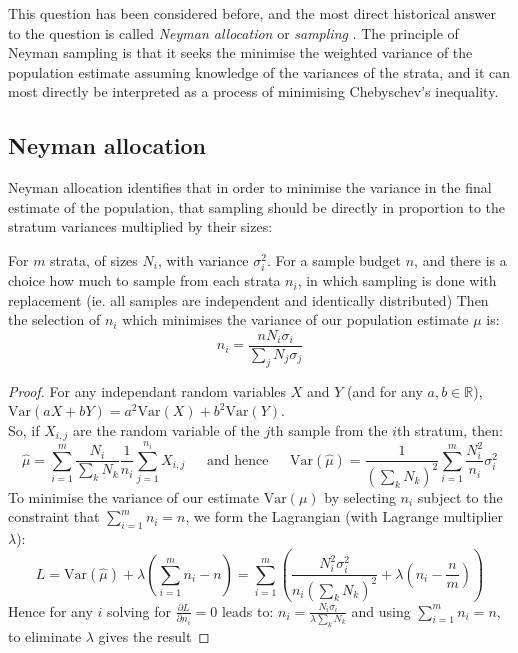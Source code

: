 This question has been considered before, and the most direct historical answer to the question is called \textit{Neyman allocation} or \textit{sampling} \citep{1938.10503378}.
The principle of Neyman sampling is that it seeks the minimise the weighted variance of the population estimate assuming knowledge of the variances of the strata, and it can most directly be interpreted as a process of minimising Chebyschev's inequality.

\subsection{Neyman allocation}\label{sec:neyman_sampling}

Neyman allocation identifies that in order to minimise the variance in the final estimate of the population, that sampling should be directly in proportion to the stratum variances multiplied by their sizes:

\begin{theorem}\label{thm:neyman_selection}
For $m$ strata, of sizes $N_i$, with variance $\sigma_i^2$. For a sample budget $n$, and there is a choice how much to sample from each strata $n_i$, in which sampling is done with replacement (ie. all samples are independent and identically distributed)
Then the selection of $n_i$ which minimises the variance of our population estimate $\mu$ is:
$$n_i = \frac{nN_i\sigma_i}{\sum_jN_j\sigma_j}$$
\end{theorem}
\begin{proof}
For any independant random variables $X$ and $Y$ (and for any $a,b\in \mathbb{R}$), $\text{Var}(aX+bY) = a^2\text{Var}(X)+b^2\text{Var}(Y)$.\\
So, if $X_{i,j}$ are the random variable of the $j$th sample from the $i$th stratum, then:
\begin{equation}\label{eq:variance_decomposition_for_strata_mean} \hat{\mu} = \sum_{i=1}^m\frac{N_i}{\sum_kN_k}\frac{1}{n_i}\sum_{j=1}^{n_i}X_{i,j} ~~~~~~~\text{and hence}~~~~~~~\text{Var}(\hat{\mu}) = \frac{1}{\left(\sum_kN_k\right)^2} \sum_{i=1}^m\frac{N_i^2}{n_i}\sigma_i^2 \end{equation}
To minimise the variance of our estimate $\text{Var}(\mu)$ by selecting $n_i$ subject to the constraint that $\sum_{i=1}^m n_i = n$, we form the Lagrangian (with Lagrange multiplier $\lambda$):
$$L = \text{Var}(\hat{\mu}) + \lambda\left(\sum_{i=1}^mn_i-n\right) = \sum_{i=1}^m\left(\frac{N_i^2\sigma_i^2}{n_i\left(\sum_kN_k\right)^2} + \lambda \left(n_i-\frac{n}{m}\right)\right)$$
Hence for any $i$ solving for $\frac{\partial L}{\partial n_i}=0$ leads to:
$n_i = \frac{N_i\sigma_i}{\lambda\sum_kN_k}$ and using $\sum_{i=1}^m n_i = n$, to eliminate $\lambda$ gives the result
\end{proof}

